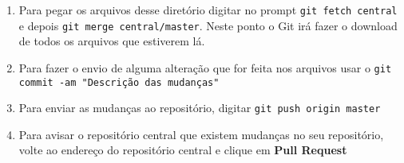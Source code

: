 \documentclass[letterpaper,11pt]{article}
\begin{document}
\begin{enumerate}
{\small
\verb+git remote add central https://github.com/abelsiqueira/ia369-documentacao.git+}
\item Para pegar os arquivos desse diretório digitar no prompt 
\verb+git fetch central+ e
depois 
\verb+git merge central/master+. Neste ponto o Git irá fazer o download de
todos os arquivos que estiverem lá.
\item Para fazer o envio de alguma alteração que for feita nos arquivos
 usar o 
\verb+git commit -am "Descrição das mudanças"+
\item Para enviar as mudanças ao repositório, digitar 
\verb+git push origin master+
\item Para avisar o repositório central que existem mudanças no seu
repositório, volte ao endereço do repositório central e clique em
{\bf Pull Request}
\end{enumerate}
\end{document}
